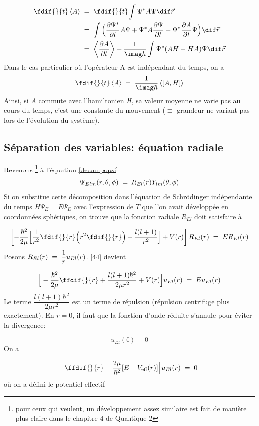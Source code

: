 \begin{align*}
    \fdif{}{t}  \left<A\right> &\eq \fdif{}{t} \int \Psi^{*} A \Psi \dif\Vec{r} \\
    &\eq \int\Big(\dfrac{\partial\Psi^{*}}{\partial t}A \Psi + \Psi^{*} A \dfrac{\partial \Psi }{\partial t } + \Psi^{*} \dfrac{\partial A}{\partial t}\Psi \Big) \dif\Vec{r}\\
    &\eq \left< \dfrac{\partial A}{\partial t} \right> +\dfrac{1}{\imag\hbar} \int \Psi^{*} (AH-HA)\Psi \dif\Vec{r}
\end{align*}
Dans le cas particulier où l'opérateur A est indépendant du temps, on a
\[
    \fdif{}{t} \left<A\right>\eq \dfrac{1}{\imag\hbar}\left<[A,H]\right>
\]
Ainsi, si $A$ commute avec l'hamiltonien $H$, sa valeur moyenne ne varie pas au cours du temps, c'est une constante du mouvement ($\equiv$ grandeur ne variant pas lors de l'évolution du système).



\subsection{Séparation des variables: équation radiale}
Revenons \footnote{pour ceux qui veulent, un développement assez similaire est fait de
manière plus claire dans le chapitre 4 de Quantique 2} à l'équation \eqref{decompopsi}
\[
    \Psi_{Elm}(r, \theta, \phi)\; = \; R_{El}(r)Y_{lm}(\theta, \phi)
\]
Si on substitue cette décomposition dans l'équation de Schrödinger indépendante du temps $H\Psi_E=E\Psi_E$ avec l'expression de $T$ que l'on avait développée en coordonnées sphériques, on trouve que la fonction radiale $R_{El}$ doit satisfaire à

\begin{equation}
    \left[-\dfrac{\hbar^2}{2\mu}\Big[\dfrac{1}{r^2}\fdif{}{r}\Big(r^2\fdif{}{r}\Big) - \dfrac{l(l+1)}{r^2}\Big]+V(r)\right]R_{El}(r)\eq ER_{El}(r)
    \label{44}
\end{equation}
Posons $R_{El}(r)\; = \; \dfrac{1}{r}u_{El}(r)$. \eqref{44} devient


\[
    \Big[-\dfrac{\hbar^2}{2\mu}\ffdif{}{r}+\dfrac{l(l+1)\hbar^2}{2 \mu r^2}+V(r)\Big] u_{El}(r)\eq Eu_{El}(r)
\]
Le terme $\dfrac{l(l+1)\hbar^2}{2\mu r^2}$ est un terme de répulsion (répulsion centrifuge plus exactement). En $r=0$, il faut que la fonction d'onde réduite s'annule pour éviter la divergence:


\[u_{El}(0)=0\]
On a


\begin{equation}
    \Big[\ffdif{}{r}+\dfrac{2\mu}{\hbar^2}[E-V_\text{eff}(r)]\Big]u_{El}(r)\eq 0
    \label{jsp}
\end{equation}
où on a défini le potentiel effectif


